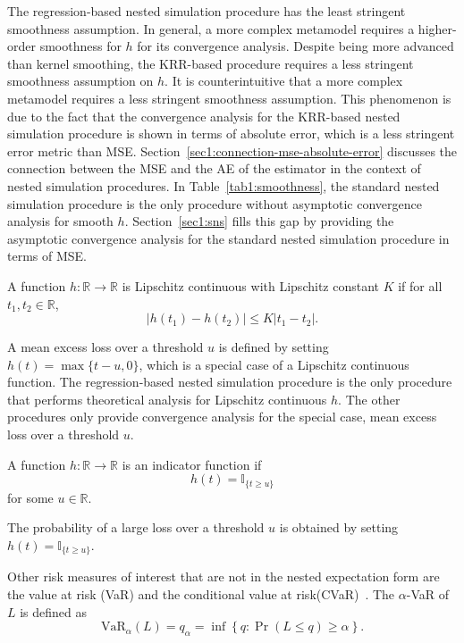 The regression-based nested simulation procedure has the least stringent smoothness assumption.
In general, a more complex metamodel requires a higher-order smoothness for $h$ for its convergence analysis.
Despite being more advanced than kernel smoothing, the KRR-based procedure requires a less stringent smoothness assumption on $h$.
It is counterintuitive that a more complex metamodel requires a less stringent smoothness assumption.
This phenomenon is due to the fact that the convergence analysis for the KRR-based nested simulation procedure is shown in terms of absolute error, which is a less stringent error metric than MSE.
Section~\ref{sec1:connection-mse-absolute-error} discusses the connection between the MSE and the AE of the estimator in the context of nested simulation procedures.
In Table~\ref{tab1:smoothness}, the standard nested simulation procedure is the only procedure without asymptotic convergence analysis for smooth $h$.
Section~\ref{sec1:sns} fills this gap by providing the asymptotic convergence analysis for the standard nested simulation procedure in terms of MSE.

\begin{definition} \label{def1:lipschitz}
    A function $h: \mathbb{R} \rightarrow \mathbb{R}$ is Lipschitz continuous with Lipschitz constant $K$ if for all $t_1, t_2 \in \mathbb{R}$, 
    $$|h(t_1) - h(t_2)| \leq K|t_1 - t_2|.$$
\end{definition}

A mean excess loss over a threshold $u$ is defined by setting $h(t) = \max\{t - u, 0\}$, which is a special case of a Lipschitz continuous function.
The regression-based nested simulation procedure is the only procedure that performs theoretical analysis for Lipschitz continuous $h$.
The other procedures only provide convergence analysis for the special case, mean excess loss over a threshold $u$.

\begin{definition} \label{def1:indicator}
    A function $h: \mathbb{R} \rightarrow \mathbb{R}$ is an indicator function if 
    $$h(t) = \mathbb{I}_{\{t \geq u\}}$$
    for some $u \in \mathbb{R}$.
\end{definition}

The probability of a large loss over a threshold $u$ is obtained by setting $h(t) = \mathbb{I}_{\{t \geq u\}}$.

Other risk measures of interest that are not in the nested expectation form are the value at risk (VaR) and the conditional value at risk(CVaR)~\citep{hardy2022quantitative}. 
The $\alpha$-VaR of $L$ is defined as
\begin{equation} \label{eq1:var}
    \mbox{VaR}_\alpha(L) = q_\alpha = \inf \left\{ q: \Pr(L\leq q) \geq \alpha \right\}.
\end{equation}
    
